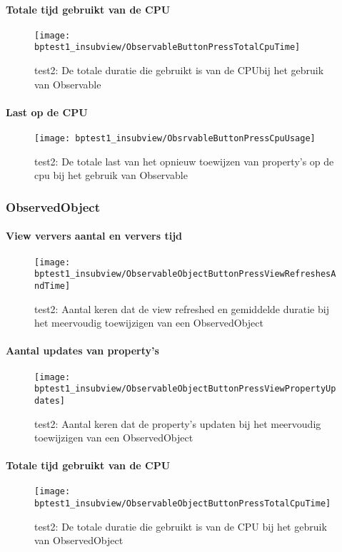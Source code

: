 \paragraph{Totale tijd gebruikt van de CPU}
\begin{figure}[H]
    \centering
    \texttt{[image: bptest1\_insubview/ObservableButtonPressTotalCpuTime]} 
    \caption{test2: De totale duratie die gebruikt is van de CPUbij het gebruik van Observable}
    \label{fig:cpuUsageTimeObservable1}
\end{figure}
\paragraph{Last op de CPU}
\begin{figure}[H]
    \centering
    \texttt{[image: bptest1\_insubview/ObsrvableButtonPressCpuUsage]} 
    \caption{test2: De totale last van het opnieuw toewijzen van property's op de cpu bij het gebruik van Observable}
    \label{fig:cpuWeightObservable1}
\end{figure}

\subsubsection{ObservedObject}
\paragraph{View ververs aantal en ververs tijd}
\begin{figure}[H]
    \centering
    \texttt{[image: bptest1\_insubview/ObservableObjectButtonPressViewRefreshesAndTime]} 
    \caption{test2: Aantal keren dat de view refreshed en gemiddelde duratie bij het meervoudig toewijzigen van een ObservedObject}
    \label{fig:viewRefresheObservedObject1}
\end{figure}
\paragraph{Aantal updates van property's}
\begin{figure}[H]
    \centering
    \texttt{[image: bptest1\_insubview/ObservableObjectButtonPressViewPropertyUpdates]} 
    \caption{test2: Aantal keren dat de property's updaten bij het meervoudig toewijzigen van een ObservedObject}
    \label{fig:propertyUpdatesObservedObject1}
\end{figure}
\paragraph{Totale tijd gebruikt van de CPU}
\begin{figure}[H]
    \centering
    \texttt{[image: bptest1\_insubview/ObservableObjectButtonPressTotalCpuTime]} 
    \caption{test2: De totale duratie die gebruikt is van de CPU bij het gebruik van ObservedObject}
    \label{fig:cpuUsageTimeObservedObject1}
\end{figure}
